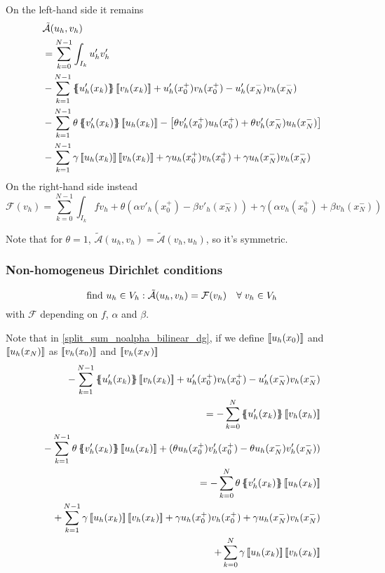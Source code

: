 On the left-hand side it remains 
\begin{equation}
    \begin{split}
        & \tilde{\mathcal{A}} (u_h, v_h) \\
        & = \sum_{k=0}^{N-1} \int_{I_k} u'_hv'_h \\
        & - \sum_{k=1}^{N-1} \average{u'_h(x_k)}\jump{v_h(x_k)} + u'_h(x^+_0)v_h(x^+_0) - u'_h(x_N^-)v_h(x_N^-) \\
        & - \sum_{k=1}^{N-1} \theta \average{v'_h(x_k)} \jump{u_h(x_k)} - \left[\theta v'_h(x^+_0)u_h(x^+_0) + \theta v'_h(x^-_N)u_h(x^-_N)\right] \\
        & - \sum_{k=1}^{N-1} \gamma \jump{u_h(x_k)} \jump{v_h(x_k)} + \gamma u_h(x^+_0)v_h(x^+_0) + \gamma u_h(x_N^-)v_h(x_N^-) \label{split_sum_noalpha_bilinear_dg}
    \end{split}
\end{equation}
On the right-hand side instead
\begin{equation}
    \mathcal{F}(v_h) = \sum_{k=0}^{N-1} \int_{I_k} f v_h + \theta(\alpha v'_h(x^+_0) - \beta v'_h(x_N^-)) + \gamma(\alpha v_h(x^+_0) + \beta v_h(x^-_N))
\end{equation}
\begin{remark}
    Note that for \(\theta = 1\), \(\tilde{\mathcal{A}}(u_h, v_h) = \tilde{\mathcal{A}}(v_h, u_h)\), so it's symmetric.
\end{remark}
\subsubsection*{Non-homogeneus Dirichlet conditions}
\begin{equation}
    \text{find } u_h \in V_h : \tilde{\mathcal{A}}(u_h, v_h) = \mathcal{F}(v_h) \quad \forall \; v_h \in V_h
    \label{functional_dg}
\end{equation}
with \(\mathcal{F}\) depending on \(f\), \(\alpha\) and \(\beta\).

Note that in \eqref{split_sum_noalpha_bilinear_dg}, if we define \(\left[\!\left[u_h(x_0)\right]\!\right]\) and \(\left[\!\left[u_h(x_N)\right]\!\right]\) as \(\left[\!\left[v_h(x_0)\right]\!\right]\) and \(\left[\!\left[v_h(x_N)\right]\!\right]\)
\begin{equation*}
    \begin{split}
        -\sum_{k=1}^{N-1} \average{u'_h(x_k)} \jump{v_h(x_k)} + u'_h(x_0^+)v_h(x^+_0) - u'_h(x_N^-)v_h(x_N^-) \\
        = -\sum_{k=0}^{N} \average{u'_h(x_k)} \jump{v_h(x_h)} \\
         -\sum_{k=1}^{N-1} \theta \average{v'_h(x_k)} \jump{u_h(x_k)} + (\theta u_h(x_0^+)v'_h(x_0^+) - \theta u_h(x_N^-)v'_h(x_N^-)) \\
        = - \sum_{k=0}^{N} \theta \average{v'_h(x_k)}\jump{u_h(x_k)} \\
        + \sum_{k=1}^{N-1} \gamma \jump{u_h(x_k)} \jump{v_h(x_k)} + \gamma u_h(x_0^+)v_h(x_0^+) + \gamma u_h(x_N^-)v_h(x_N^-) \\
        + \sum_{k=0}^{N} \gamma \jump{u_h(x_k)}\jump{v_h(x_k)}
    \end{split}
\end{equation*}
